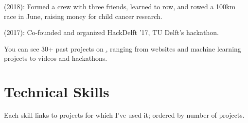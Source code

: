 \documentclass[]{deedy-resume-openfont}
\begin{document}
\begin{minipage}[t]{0.66\textwidth}
\vspace{0.3\topsep}
\href{https://leonoverweel.com/projects/2018/ringvaart/}{} (2018): Formed a crew with three friends, learned to row, and rowed a 100km race in June, raising money for child cancer research.

\vspace{0.3\topsep}
\href{https://leonoverweel.com/projects/2017/hackdelft/}{} (2017): Co-founded and organized HackDelft '17, TU Delft's hackathon.

\vspace{0.2cm}
You can see 30+ past projects on \href{http://leonoverweel.com/}{,} ranging from websites and machine learning projects to videos and hackathons.

\vspace{0.3\topsep}


\section{Technical Skills}

Each skill links to projects for which I've used it; ordered by number of projects.

\vspace{0.3\topsep}
\href{https://leonoverweel.com/tags/language-python/}{} \textbullet \
\href{https://leonoverweel.com/tags/language-css/}{} \textbullet \
\href{https://leonoverweel.com/tags/language-html/}{} \textbullet \
\href{https://leonoverweel.com/tags/language-javascript/}{} \textbullet \
\href{https://leonoverweel.com/tags/language-c++/}{} \textbullet \
\href{https://leonoverweel.com/tags/language-java/}{}

\vspace{0.3\topsep}
\custombold{Technical Tools:}
\href{https://leonoverweel.com/tags/tool-git/}{\custombold{Git}} \textbullet \
\href{https://leonoverweel.com/tags/tool-github/}{} \textbullet \
\href{https://leonoverweel.com/tags/tool-google-app-engine/}{} \textbullet \
\href{https://leonoverweel.com/tags/tool-flask/}{} \textbullet \
\href{https://leonoverweel.com/tags/tool-github-pages/}{}


\end{minipage}
\end{document}
